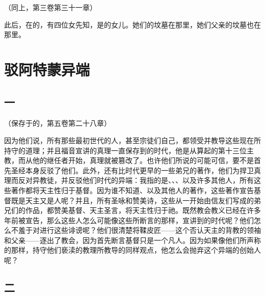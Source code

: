 （同上，第三卷第三十一章）\par

此后，在的，有四位女先知，是的女儿。她们的坟墓在那里，她们父亲的坟墓也在那里。\par


\section{驳阿特蒙异端}


\subsection{一}

（保存于的，第五卷第二十八章）\par

因为他们说，所有那些最初世代的人，甚至宗徒们自己，都领受并教导这些现在所持守的道理；并且福音宣讲的真理一直保存到的时代，他是从算起的第十三位主教，而从他的继任者开始，真理就被篡改了。也许他们所说的可能可信，要不是首先圣经本身反驳了他们。此外，还有比时代更早的一些弟兄的著作，他们为捍卫真理而反对异教徒，并反驳他们时代的异端：我指的是、、、以及许多其他人，所有这些著作都将天主性归于基督。因为谁不知道、以及其他人的著作，这些著作宣告基督既是天主又是人呢？并且，所有圣咏和赞美诗，这些从一开始由信友们写成的弟兄们的作品，都赞美基督、天主圣言，将天主性归于祂。既然教会教义已经在许多年前被宣告，那么这些人怎么可能像这些所断言的那样，宣讲到的时代呢？他们怎么不羞于对进行这些诽谤呢？他们很清楚将鞣皮匠——这个否认天主的背教的领袖和父亲——逐出了教会，因为首先断言基督只是一个凡人。因为如果像他们所声称的那样，持守他们亵渎的教理所教导的同样观点，他怎么会抛弃这个异端的创始人呢？\par


\subsection{二}

